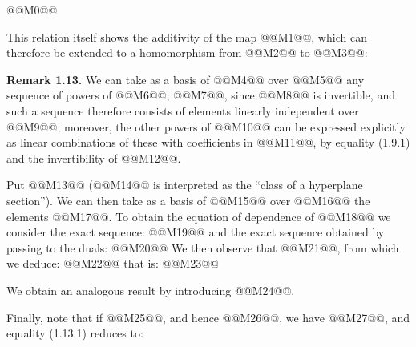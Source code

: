 @@M0@@

This relation itself shows the additivity of the map @@M1@@, which can therefore be extended to a homomorphism from @@M2@@ to @@M3@@:

\textbf{Remark 1.13.} We can take as a basis of @@M4@@ over @@M5@@ any sequence of powers of @@M6@@; @@M7@@, since @@M8@@ is invertible, and such a sequence therefore consists of elements linearly independent over @@M9@@; moreover, the other powers of @@M10@@ can be expressed explicitly as linear combinations of these with coefficients in @@M11@@, by equality (1.9.1) and the invertibility of @@M12@@.

Put @@M13@@ (@@M14@@ is interpreted as the ``class of a hyperplane section''). We can then take as a basis of @@M15@@ over @@M16@@ the elements @@M17@@. To obtain the equation of dependence of @@M18@@ we consider the exact sequence:
@@M19@@
and the exact sequence obtained by passing to the duals:
@@M20@@
We then observe that @@M21@@, from which we deduce:
@@M22@@
that is:
@@M23@@

We obtain an analogous result by introducing @@M24@@.

Finally, note that if @@M25@@, and hence @@M26@@, we have @@M27@@, and equality (1.13.1) reduces to:
